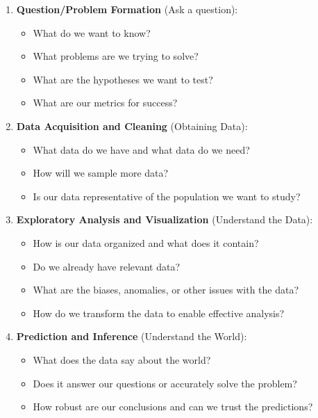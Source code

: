 \begin{enumerate}
\item \textbf{Question/Problem Formation} (Ask a question):
\begin{itemize}
\item What do we want to know?
\item What problems are we trying to solve?
\item What are the hypotheses we want to test?
\item What are our metrics for success?
\end{itemize}
\item \textbf{Data Acquisition and Cleaning} (Obtaining Data):
\begin{itemize}
\item What data do we have and what data do we need?
\item How will we sample more data?
\item Is our data representative of the population we want to study?
\end{itemize}
\item \textbf{Exploratory Analysis and Visualization} (Understand the Data):
\begin{itemize}
\item How is our data organized and what does it contain?
\item Do we already have relevant data?
\item What are the biases, anomalies, or other issues with the data?
\item How do we transform the data to enable effective analysis?
\end{itemize}
\item \textbf{Prediction and Inference} (Understand the World):
\begin{itemize}
\item What does the data say about the world?
\item Does it answer our questions or accurately solve the problem?
\item How robust are our conclusions and can we trust the predictions?
\end{itemize}
\end{enumerate}
